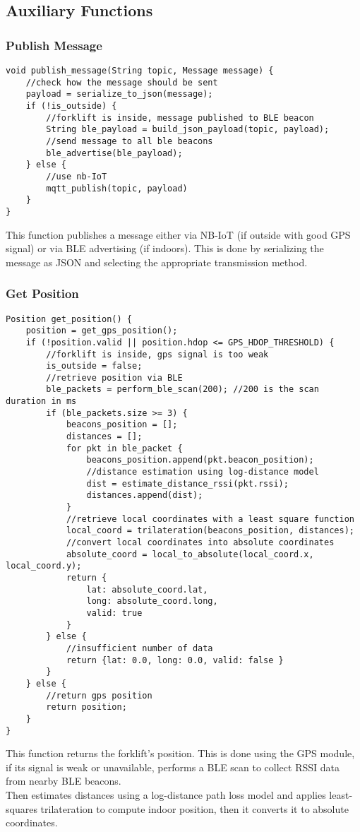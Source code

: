 \subsection{Auxiliary Functions}
\subsubsection{Publish Message}
\begin{verbatim}
void publish_message(String topic, Message message) {
    //check how the message should be sent
    payload = serialize_to_json(message);
    if (!is_outside) {
        //forklift is inside, message published to BLE beacon
        String ble_payload = build_json_payload(topic, payload);
        //send message to all ble beacons
        ble_advertise(ble_payload);
    } else {
        //use nb-IoT
        mqtt_publish(topic, payload)
    }
}
\end{verbatim}
This function publishes a message either via NB-IoT (if outside with good GPS signal) or via BLE advertising (if indoors). 
This is done by serializing the message as JSON and selecting the appropriate transmission method.
\subsubsection{Get Position}
\begin{verbatim}
Position get_position() {
    position = get_gps_position();
    if (!position.valid || position.hdop <= GPS_HDOP_THRESHOLD) {
        //forklift is inside, gps signal is too weak
        is_outside = false;
        //retrieve position via BLE
        ble_packets = perform_ble_scan(200); //200 is the scan duration in ms
        if (ble_packets.size >= 3) {
            beacons_position = [];
            distances = [];
            for pkt in ble_packet {
                beacons_position.append(pkt.beacon_position);
                //distance estimation using log-distance model
                dist = estimate_distance_rssi(pkt.rssi);
                distances.append(dist);
            }
            //retrieve local coordinates with a least square function
            local_coord = trilateration(beacons_position, distances);
            //convert local coordinates into absolute coordinates
            absolute_coord = local_to_absolute(local_coord.x, local_coord.y);
            return {
                lat: absolute_coord.lat,
                long: absolute_coord.long,
                valid: true
            }
        } else {
            //insufficient number of data
            return {lat: 0.0, long: 0.0, valid: false }
        }
    } else {
        //return gps position
        return position;
    }
}
\end{verbatim}
This function returns the forklift's position. This is done using the GPS module, if its signal is weak or unavailable, performs a BLE scan to collect RSSI data from nearby BLE beacons. \\
Then estimates distances using a log-distance path loss model and applies least-squares trilateration to compute indoor position, then it converts it to absolute coordinates.
